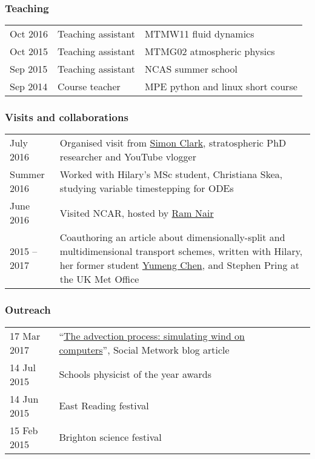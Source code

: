 \documentclass[a4paper,11pt]{article}
\begin{document}
\subsubsection*{Teaching}
\begin{tabular}{l l l}
Oct 2016 & Teaching assistant & MTMW11 fluid dynamics \\
Oct 2015 & Teaching assistant & MTMG02 atmospheric physics \\
Sep 2015 & Teaching assistant & NCAS summer school \\
Sep 2014 & Course teacher & MPE python and linux short course \\
\end{tabular}

\subsubsection*{Visits and collaborations}
\begin{tabularx}{\linewidth}{l X}
July 2016 & Organised visit from \href{https://www.youtube.com/user/SimonOxfPhys}{Simon Clark}, stratospheric PhD researcher and YouTube vlogger \\
Summer 2016 & Worked with Hilary's MSc student, Christiana Skea, studying variable timestepping for ODEs \\
June 2016 & Visited NCAR, hosted by \href{http://www.image.ucar.edu/staff/rnair/}{Ram Nair} \\
2015 -- 2017 & Coauthoring an article about dimensionally-split and multidimensional transport schemes, written with Hilary, her former student \href{https://www.clisap.de/research/a:-climate-dynamics-and-variability/crg-numerical-methods-in-geosciences/team-members/yumeng-chen/}{Yumeng Chen}, and Stephen Pring at the UK Met Office \\
\end{tabularx}

\subsubsection*{Outreach}
\begin{tabular}{l l l}
17 Mar 2017 & ``\href{https://thesocialmetwork.wordpress.com/2017/03/17/simulating-wind-on-computers/}{The advection process: simulating wind on computers}'', Social Metwork blog article \\
14 Jul 2015 & Schools physicist of the year awards \\
14 Jun 2015 & East Reading festival \\
15 Feb 2015 & Brighton science festival \\
\end{tabular}
\end{document}
